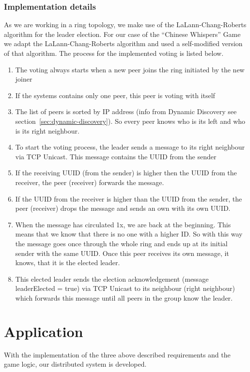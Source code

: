 \documentclass[runningheads]{llncs}
\begin{document}
        \subsubsection{Implementation details}
            As we are working in a ring topology, we make use of the LaLann-Chang-Roberts algorithm for the leader election. For our case of the \enquote{Chinese Whispers}  Game we adapt the LaLann-Chang-Roberts algorithm and used a self-modified version of that algorithm. The process for the implemented voting is listed below.
            \begin{enumerate}
                \item The voting always starts when a new peer joins the ring initiated by the new joiner
                \item If the systems contains only one peer, this peer is voting with itself
                \item The list of peers is sorted by IP address (info from Dynamic Discovery see section~\ref{sec:dynamic-discovery}). So every peer knows who is its left and who is its right neighbour.
                \item To start the voting process, the leader sends a message to its right neighbour via TCP Unicast. This message contains the UUID from the sender
                \item If the receiving UUID (from the sender) is higher then the UUID from the receiver, the peer (receiver) forwards the message. 
                \item If the UUID from the receiver is higher than the UUID from the sender, the peer (receiver) drops the message and sends an own with its own UUID.
                \item When the message has circulated 1x, we are back at the beginning. This means that we know that there is no one with a higher ID. So with this way the message goes once through the whole ring and ends up at its initial sender with the same UUID. Once this peer receives its own message, it knows, that it is the elected leader.
                \item This elected leader sends the election acknowledgement (message leaderElected = true) via TCP Unicast to its neighbour (right neighbour) which forwards this message until all peers in the group know the leader.
            \end{enumerate}

\section{Application}
    With the implementation of the three above described requirements and the game logic, our distributed system is developed.
    
\end{document}
